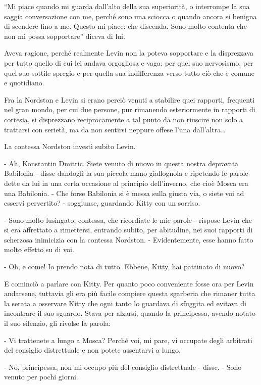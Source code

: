 ``Mi piace quando mi guarda dall'alto della sua superiorità, o interrompe la sua saggia conversazione con me, perché sono una sciocca o quando ancora si benigna di scendere fino a me. Questo mi piace: che discenda. Sono molto contenta che non mi possa sopportare'' diceva di lui. 

Aveva ragione, perché realmente Levin non la poteva sopportare e la disprezzava per tutto quello di cui lei andava orgogliosa e vaga: per quel suo nervosismo, per quel suo sottile spregio e per quella sua indifferenza verso tutto ciò che è comune e quotidiano. 

Fra la Nordston e Levin si erano perciò venuti a stabilire quei rapporti, frequenti nel gran mondo, per cui due persone, pur rimanendo esteriormente in rapporti di cortesia, si disprezzano reciprocamente a tal punto da non riuscire non solo a trattarsi con serietà, ma da non sentirsi neppure offese l'una dall'altra\ldots{} 

La contessa Nordston investì subito Levin. 

- Ah, Konstantin Dmitric. Siete venuto di nuovo in questa nostra depravata Babilonia - disse dandogli la sua piccola mano giallognola e ripetendo le parole dette da lui in una certa occasione al principio dell'inverno, che cioè Mosca era una Babilonia. - Che forse Babilonia si è messa sulla giusta via, o siete voi ad esservi pervertito? - soggiunse, guardando Kitty con un sorriso. 

- Sono molto lusingato, contessa, che ricordiate le mie parole - rispose Levin che si era affrettato a rimettersi, entrando subito, per abitudine, nei suoi rapporti di scherzosa inimicizia con la contessa Nordston. - Evidentemente, esse hanno fatto molto effetto su di voi. 

- Oh, e come! Io prendo nota di tutto. Ebbene, Kitty, hai pattinato di nuovo? 

E cominciò a parlare con Kitty. Per quanto poco conveniente fosse ora per Levin andarsene, tuttavia gli era più facile compiere questa sgarberia che rimaner tutta la serata a osservare Kitty che ogni tanto lo guardava di sfuggita ed evitava di incontrare il suo sguardo. Stava per alzarsi, quando la principessa, avendo notato il suo silenzio, gli rivolse la parola: 

- Vi trattenete a lungo a Mosca? Perché voi, mi pare, vi occupate degli arbitrati del consiglio distrettuale e non potete assentarvi a lungo. 

- No, principessa, non mi occupo più del consiglio distrettuale - disse. - Sono venuto per pochi giorni. 

